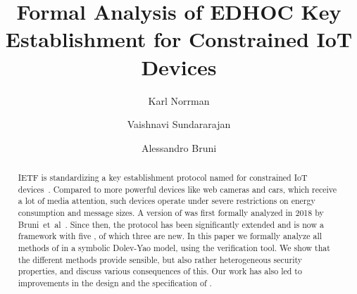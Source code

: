 \documentclass[runningheads, envcountsame, a4paper, draft, x11names]{llncs}
\begin{document}
\title{Formal Analysis of EDHOC Key Establishment for Constrained IoT Devices}
\author{Karl Norrman \and
Vaishnavi Sundararajan \and
Alessandro Bruni
}
%
%
%
\maketitle
%

\begin{abstract}
    IETF is standardizing a key establishment protocol named \mEdhoc{} for
constrained IoT devices~\cite{selander-lake-edhoc-01}.
%
Compared to more powerful devices like web cameras and cars, which receive a lot of media attention, such devices operate under severe restrictions on energy consumption and message sizes.
%
%
A version of \mEdhoc{} was first formally analyzed in 2018 by Bruni~et~al~\cite{DBLP:conf/secsr/BruniJPS18}.
%
Since then, the protocol has been significantly extended and is now a
framework with five , of which three are new.
%
%
In this paper we formally analyze all methods of \mEdhoc{} in a symbolic
Dolev-Yao model, using the \mTamarin{} verification tool. 
%
We show that the different methods provide sensible, but also rather
heterogeneous security properties, and discuss various consequences of this. Our work has also led to improvements in the design and the specification of \mEdhoc.
%
\end{abstract}
%

\vspace{-2.5em}
\end{document}
